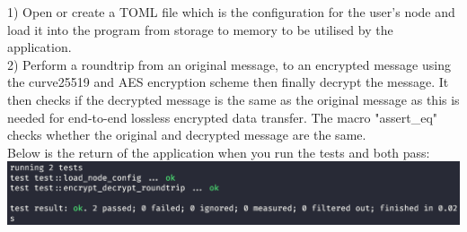 \documentclass[a4paper, titlepage]{article}
\begin{document}
1) Open or create a TOML file which is the configuration for the user's node and load it into the program from storage to memory to be utilised by the application. \\

2) Perform a roundtrip from an original message, to an encrypted message using the curve25519 and AES encryption scheme then finally decrypt the message. It then checks if the decrypted message is the same as the original message as this is needed for end-to-end lossless encrypted data transfer. The macro "assert\_eq" checks whether the original and decrypted message are the same.\\

Below is the return of the application when you run the tests and both pass: \\

\includegraphics[width=1\textwidth]{tests_running.png}\par
\end{document}
